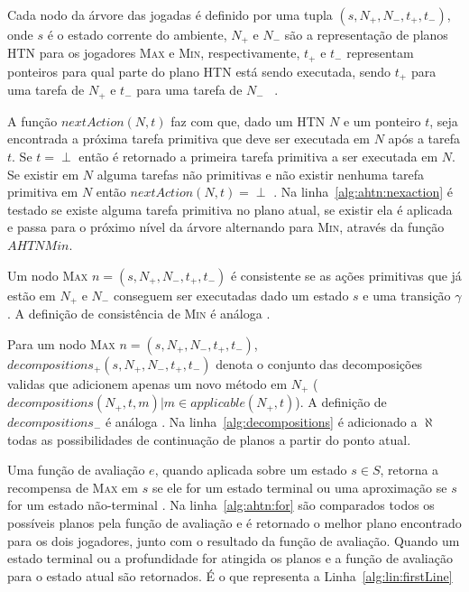 Cada nodo da árvore das jogadas é definido por uma tupla $(s, N_{+}, N_{-}, t_{+}, t_{-})$, onde $s$ é o estado corrente do ambiente, $N_{+}$ e $N_{-}$ são a representação de planos HTN para os jogadores \textsc{Max} e \textsc{Min}, respectivamente, $t_{+}$ e $t_{-}$ representam ponteiros para qual parte do plano HTN está sendo executada, sendo $t_{+}$ para uma tarefa de $N_{+}$ e $t_{-}$ para uma tarefa de $N_{-}$ ~\cite{ontanon2015adversarial}.

A função $nextAction(N,t)$ faz com que, dado um HTN $N$ e um ponteiro $t$, seja encontrada a próxima tarefa primitiva que deve ser executada em $N$ após a tarefa $t$. Se $t = \perp$ então é retornado a primeira tarefa primitiva a ser executada em $N$. 
Se existir em $N$ alguma tarefas não primitivas e não existir nenhuma tarefa primitiva em $N$ então $nextAction(N,t) = \perp$ \cite{ontanon2015adversarial}.
Na linha~\ref{alg:ahtn:nexaction} é testado se existe alguma tarefa primitiva no plano atual, se existir ela é aplicada e passa para o próximo nível da árvore alternando para \textsc{Min}, através da função $AHTNMin$. 

Um nodo \textsc{Max} $n = (s, N_{+}, N_{-}, t_{+}, t_{-})$ é consistente se as ações primitivas que já estão em $N_{+}$ e $N_{-}$ conseguem ser executadas dado um estado $s$ e uma transição $\gamma$. A definição de consistência de \textsc{Min} é análoga \cite{ontanon2015adversarial}.

Para um nodo \textsc{Max} $n = (s, N_{+}, N_{-}, t_{+}, t_{-})$, $decompositions_{+}(s, N_{+}, N_{-}, t_{+}, t_{-})$ denota o conjunto das decomposições validas que adicionem apenas um novo método em $N_{+}$ (${decompositions(N_{+}, t, m) | m \in applicable(N_{+}, t)}$).
A definição de $decompositions_{-}$ é análoga \cite{ontanon2015adversarial}.
Na linha~\ref{alg:decompositions} é adicionado a $\aleph$ todas as possibilidades de continuação de planos a partir do ponto atual.

Uma função de avaliação $e$, quando aplicada sobre um estado $s \in S$, retorna a recompensa de \textsc{Max} em $s$ se ele for um estado terminal ou uma aproximação se $s$ for um estado não-terminal \cite{ontanon2015adversarial}. 
Na linha~\ref{alg:ahtn:for} são comparados todos os possíveis planos pela função de avaliação e é retornado o melhor plano encontrado para os dois jogadores, junto com o resultado da função de avaliação. 
Quando um estado terminal ou a profundidade for atingida os planos e a função de avaliação para o estado atual são retornados. É o que representa a Linha~\ref{alg:lin:firstLine}

